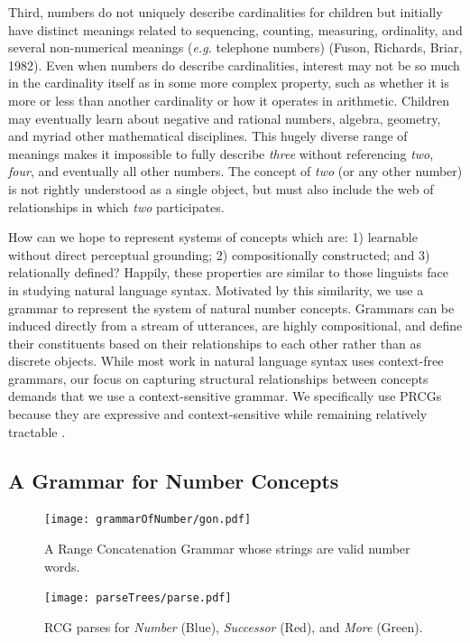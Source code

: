 \documentclass[10pt,letterpaper]{article}
\begin{document}
Third, numbers do not uniquely describe cardinalities for children but
initially have distinct meanings related to sequencing, counting,
measuring, ordinality, and several non-numerical meanings ({\it e.g.}
telephone numbers) (Fuson, Richards, Briar, 1982). Even when numbers
do describe cardinalities, interest may not be so much in the
cardinality itself as in some more complex property, such as whether
it is more or less than another cardinality or how it operates
in arithmetic. Children may eventually learn about negative
and rational numbers, algebra, geometry, and myriad other mathematical
disciplines. This hugely diverse range of meanings makes it impossible
to fully describe \emph{three} without referencing \emph{two},
\emph{four}, and eventually all other numbers. The concept of
\emph{two} (or any other number) is not rightly understood as a single
object, but must also include the web of relationships in which
\emph{two} participates.

How can we hope to represent systems of concepts which are: 1)
learnable without direct perceptual grounding; 2) compositionally
constructed; and 3) relationally defined? Happily, these properties
are similar to those linguists face in studying natural language
syntax. Motivated by this similarity, we use a grammar to represent
the system of natural number concepts. Grammars can be induced
directly from a stream of utterances, are highly compositional, and
define their constituents based on their relationships to each other
rather than as discrete objects. While most work in natural language
syntax uses context-free grammars, our focus on capturing structural
relationships between concepts demands that we use a context-sensitive
grammar. We specifically use PRCGs because they are expressive and
context-sensitive while remaining relatively tractable
\citep{boullier2005range}.

\subsection{A Grammar for Number Concepts}

\begin{figure}[t]
  \begin{centering}
    \texttt{[image: grammarOfNumber/gon.pdf]}
    \caption{A Range Concatenation Grammar whose strings are valid number words.}
    \label{fig:gon}
  \end{centering}
\end{figure}

\begin{figure}[t]
  \begin{centering}
    \texttt{[image: parseTrees/parse.pdf]}
    \caption{RCG parses for \emph{Number} (Blue), \emph{Successor} (Red), and \emph{More} (Green).}
    \label{fig:parse}
  \end{centering}
\end{figure}
\end{document}
